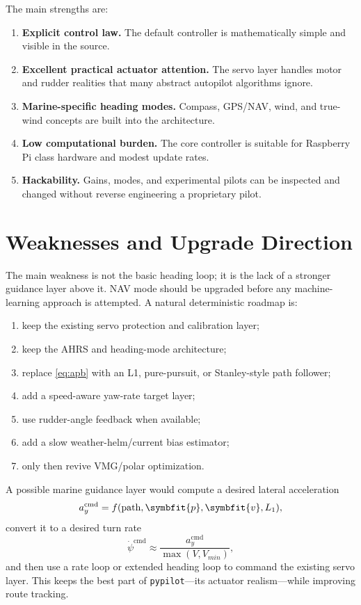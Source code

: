 \documentclass[11pt,twocolumn]{article}
\newcommand{\vct}[1]{\symbfit{#1}}   %
\newcommand{\heading}{\psi}
\newcommand{\cmd}{\mathrm{cmd}}
\begin{document}
The main strengths are:
\begin{enumerate}
\item \textbf{Explicit control law.}  The default controller is mathematically simple and
visible in the source.
\item \textbf{Excellent practical actuator attention.}  The servo layer handles motor and
rudder realities that many abstract autopilot algorithms ignore.
\item \textbf{Marine-specific heading modes.}  Compass, GPS/NAV, wind, and true-wind
concepts are built into the architecture.
\item \textbf{Low computational burden.}  The core controller is suitable for Raspberry Pi
class hardware and modest update rates.
\item \textbf{Hackability.}  Gains, modes, and experimental pilots can be inspected and
changed without reverse engineering a proprietary pilot.
\end{enumerate}

\section{Weaknesses and Upgrade Direction}

The main weakness is not the basic heading loop; it is the lack of a stronger guidance
layer above it.  NAV mode should be upgraded before any machine-learning approach is
attempted.  A natural deterministic roadmap is:
\begin{enumerate}
\item keep the existing servo protection and calibration layer;
\item keep the AHRS and heading-mode architecture;
\item replace \cref{eq:apb} with an L1, pure-pursuit, or Stanley-style path follower;
\item add a speed-aware yaw-rate target layer;
\item use rudder-angle feedback when available;
\item add a slow weather-helm/current bias estimator;
\item only then revive VMG/polar optimization.
\end{enumerate}

A possible marine guidance layer would compute a desired lateral acceleration
\begin{equation}
  a_y^{\cmd} = f(\text{path}, \vct{p}, \vct{v}, L_1),
\end{equation}
convert it to a desired turn rate
\begin{equation}
  \dot{\heading}^{\cmd} \approx \frac{a_y^{\cmd}}{\max(V, V_{min})},
\end{equation}
and then use a rate loop or extended heading loop to command the existing servo layer.
This keeps the best part of \texttt{pypilot}---its actuator realism---while improving
route tracking.
\end{document}
